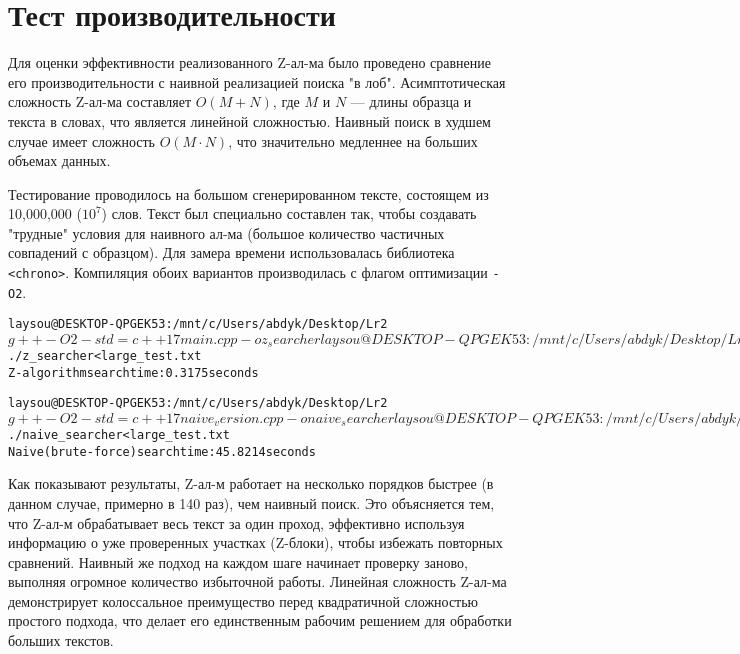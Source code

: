 \section{Тест производительности}

Для оценки эффективности реализованного Z-ал-ма было проведено сравнение его производительности с наивной реализацией поиска "в лоб". Асимптотическая сложность Z-ал-ма составляет $O(M+N)$, где $M$ и $N$ — длины образца и текста в словах, что является линейной сложностью. Наивный поиск в худшем случае имеет сложность $O(M \cdot N)$, что значительно медленнее на больших объемах данных.

Тестирование проводилось на большом сгенерированном тексте, состоящем из 10,000,000 ($10^7$) слов. Текст был специально составлен так, чтобы создавать "трудные" условия для наивного ал-ма (большое количество частичных совпадений с образцом). Для замера времени использовалась библиотека \texttt{<chrono>}. Компиляция обоих вариантов производилась с флагом оптимизации \texttt{-O2}.
\begin{alltt}
\selectfont
laysou@DESKTOP-QPGEK53:/mnt/c/Users/abdyk/Desktop/Lr2$ g++ -O2 -std=c++17 main.cpp -o z_searcher
laysou@DESKTOP-QPGEK53:/mnt/c/Users/abdyk/Desktop/Lr2$ ./z_searcher < large_test.txt
Z-algorithm search time: 0.3175 seconds

laysou@DESKTOP-QPGEK53:/mnt/c/Users/abdyk/Desktop/Lr2$ g++ -O2 -std=c++17 naive_version.cpp -o naive_searcher
laysou@DESKTOP-QPGEK53:/mnt/c/Users/abdyk/Desktop/Lr2$ ./naive_searcher < large_test.txt
Naive (brute-force) search time: 45.8214 seconds
\end{alltt}

Как показывают результаты, Z-ал-м работает на несколько порядков быстрее (в данном случае, примерно в 140 раз), чем наивный поиск. Это объясняется тем, что Z-ал-м обрабатывает весь текст за один проход, эффективно используя информацию о уже проверенных участках (Z-блоки), чтобы избежать повторных сравнений. Наивный же подход на каждом шаге начинает проверку заново, выполняя огромное количество избыточной работы. Линейная сложность Z-ал-ма демонстрирует колоссальное преимущество перед квадратичной сложностью простого подхода, что делает его единственным рабочим решением для обработки больших текстов.

\pagebreak